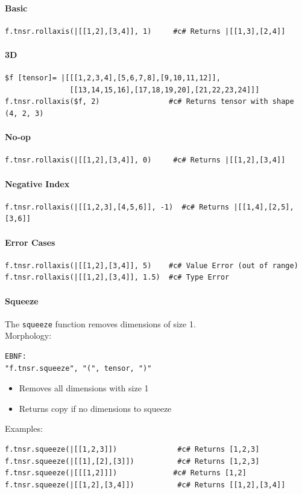 \paragraph{Basic}
\begin{verbatim}
f.tnsr.rollaxis(|[[1,2],[3,4]], 1)     #c# Returns |[[1,3],[2,4]]
\end{verbatim}

\paragraph{3D}
\begin{verbatim}
$f [tensor]= |[[[1,2,3,4],[5,6,7,8],[9,10,11,12]],
               [[13,14,15,16],[17,18,19,20],[21,22,23,24]]]
f.tnsr.rollaxis($f, 2)                #c# Returns tensor with shape (4, 2, 3)
\end{verbatim}

\paragraph{No-op}
\begin{verbatim}
f.tnsr.rollaxis(|[[1,2],[3,4]], 0)     #c# Returns |[[1,2],[3,4]]
\end{verbatim}

\paragraph{Negative Index}
\begin{verbatim}
f.tnsr.rollaxis(|[[1,2,3],[4,5,6]], -1)  #c# Returns |[[1,4],[2,5],[3,6]]
\end{verbatim}

\paragraph{Error Cases}
\begin{verbatim}
f.tnsr.rollaxis(|[[1,2],[3,4]], 5)    #c# Value Error (out of range)
f.tnsr.rollaxis(|[[1,2],[3,4]], 1.5)  #c# Type Error
\end{verbatim}

\paragraph{Squeeze}
The \texttt{squeeze} function removes dimensions of size 1.\\
Morphology:
\begin{verbatim}
EBNF:
"f.tnsr.squeeze", "(", tensor, ")"
\end{verbatim}
\begin{itemize}
\item Removes all dimensions with size 1
\item Returns copy if no dimensions to squeeze
\end{itemize}
Examples:
\begin{verbatim}
f.tnsr.squeeze(|[[1,2,3]])              #c# Returns [1,2,3]
f.tnsr.squeeze(|[[1],[2],[3]])          #c# Returns [1,2,3]
f.tnsr.squeeze(|[[[1,2]]])             #c# Returns [1,2]
f.tnsr.squeeze(|[[1,2],[3,4]])          #c# Returns [[1,2],[3,4]]
\end{verbatim}

